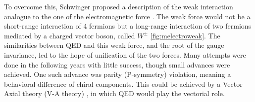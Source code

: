 To overcome this, Schwinger proposed a description of the weak interaction analogue to the one of the electromagnetic force \cite{SCHWINGER1957407}. The weak force would not be a short-range interaction of 4 fermions but a long-range interaction of two fermions mediated by a charged vector boson, called $W^{\pm}$ \ref{fig:melectroweak}. The similarities between QED and this weak force, and the root of the gauge invariance, led to the hope of unification of the two forces. Many attempts were done in the following years with little success, though small advances were achieved. One such advance was parity (P-symmetry) violation, meaning a behavioral difference of chiral components. This could be achieved by a Vector-Axial theory (V-A theory) \cite{PhysRev.109.193,PhysRev.109.1860.2}, in which QED would play the vectorial role.

